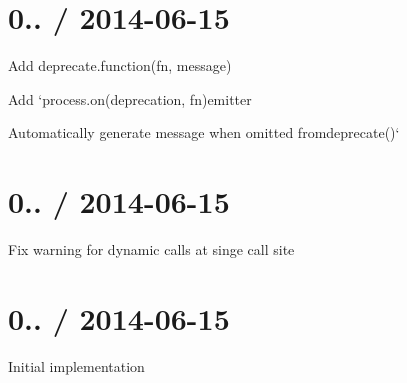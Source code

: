 \section*{0.. / 2014-\/06-\/15 }


\begin{DoxyItemize}
\item Add {\ttfamily deprecate.\+function(fn, message)}
\item Add `process.on(\textquotesingle{}deprecation\textquotesingle{}, fn){\ttfamily emitter}
\item {\ttfamily Automatically generate message when omitted from}deprecate()`
\end{DoxyItemize}

\section*{0.. / 2014-\/06-\/15 }


\begin{DoxyItemize}
\item Fix warning for dynamic calls at singe call site
\end{DoxyItemize}

\section*{0.. / 2014-\/06-\/15 }


\begin{DoxyItemize}
\item Initial implementation 
\end{DoxyItemize}